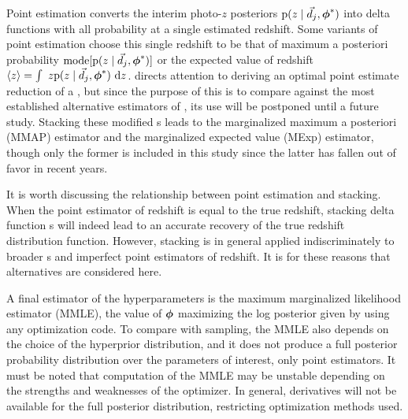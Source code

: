 Point estimation converts the interim photo-$z$ posteriors $\mathrm{p}(z \mid \vec{d}_{j}, {\boldsymbol{\phi}}^{*})$ into delta functions with all probability at a single estimated redshift.  
Some variants of point estimation choose this single redshift to be that of maximum a posteriori probability $\mathrm{mode}[\mathrm{p}(z \mid \vec{d}_{j}, {\boldsymbol{\phi}}^{*})]$ or the expected value of redshift $\langle z \rangle = \int\ z \mathrm{p}(z \mid \vec{d}_{j}, {\boldsymbol{\phi}}^{*})\ \mathrm{d} z$.
\cite{tanaka_photometric_2018-1} directs attention to deriving an optimal point estimate reduction of a \pzpdf, but since the purpose of this \paper is to compare against the most established alternative estimators of \nz, its use will be postponed until a future study.
Stacking these modified \pzpdf s leads to the marginalized maximum a posteriori (MMAP) estimator and the marginalized expected value (MExp) estimator, though only the former is included in this study since the latter has fallen out of favor in recent years.

It is worth discussing the relationship between point estimation and stacking.  
When the point estimator of redshift is equal to the true redshift, stacking delta function \pzpdf s will indeed lead to an accurate recovery of the true redshift distribution function.  
However, stacking is in general applied indiscriminately to broader \pzpdf s and imperfect point estimators of redshift.  
It is for these reasons that alternatives are considered here.

A final estimator of the hyperparameters is the maximum marginalized likelihood estimator (MMLE), the value of ${\boldsymbol{\phi}}$ maximizing the log posterior given by  using any optimization code.  
To compare with sampling, the MMLE also depends on the choice of the hyperprior distribution, and it does not produce a full posterior probability distribution over the parameters of interest, only point estimators.  
It must be noted that computation of the MMLE may be unstable depending on the strengths and weaknesses of the optimizer.  
In general, derivatives will not be available for the full posterior distribution, restricting optimization methods used.

